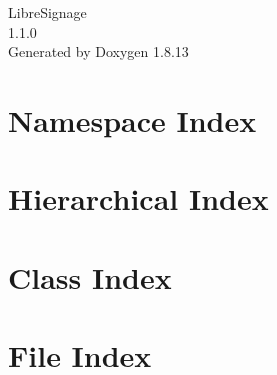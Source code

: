 \documentclass[twoside]{book}
\newcommand{\+}{\discretionary{\mbox{\scriptsize$\hookleftarrow$}}{}{}}
\newcommand{\clearemptydoublepage}{%
  \newpage{\pagestyle{empty}\cleardoublepage}%
}
\begin{document}
\hypersetup{pageanchor=false,
             bookmarksnumbered=true,
             pdfencoding=unicode
            }
\begin{titlepage}
\vspace*{7cm}
\begin{center}%
{\Large Libre\+Signage \\[1ex]\large 1.\+1.\+0 }\\
\vspace*{1cm}
{\large Generated by Doxygen 1.8.13}\\
\end{center}
\end{titlepage}
\clearemptydoublepage
{}
\tableofcontents
\clearemptydoublepage
{}
\hypersetup{pageanchor=true}

\chapter{Namespace Index}

\chapter{Hierarchical Index}

\chapter{Class Index}

\chapter{File Index}

\end{document}
